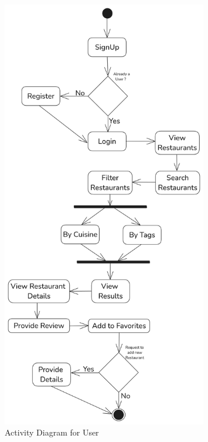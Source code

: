 \documentclass[12pt, a4paper, oneside]{article}
\begin{document}
\begin{figure}[H]
	\includegraphics[width=0.8\textwidth, height=\textheight, keepaspectratio]{images/useractivity.png}
	\centering
	\caption{Activity Diagram for User}
	\label{fig:activity}
\end{figure}
\pagebreak
\end{document}
